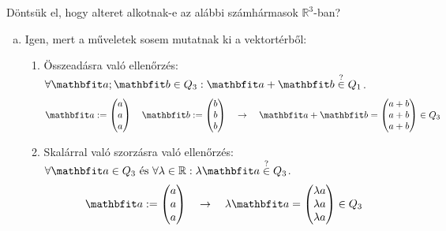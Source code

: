 \begin{exercise}{%
    Döntsük el, hogy alteret alkotnak-e az alábbi számhármasok
    $\mathbb R^3$-ban?
  }
{\begin{enumerate}[a)]
            \tcbline
      \item Igen, mert a műveletek sosem mutatnak ki a vektortérből:
            \begin{enumerate}[1)]
              \item Összeadásra való ellenőrzés:
                    $\forall \rvec a ; \rvec b \in Q_3:
                      \rvec a + \rvec b \overset{?}{\in} Q_1$.
                    \[
                      \rvec a := \begin{pmatrix} a \\ a \\ a \end{pmatrix}
                      \quad
                      \rvec b := \begin{pmatrix} b \\ b \\ b \end{pmatrix}
                      \quad \rightarrow \quad
                      \rvec a + \rvec b
                      = \begin{pmatrix} a + b \\ a + b \\ a + b \end{pmatrix}
                      \in Q_3
                    \]

              \item Skalárral való szorzásra való ellenőrzés:
                    $\forall \rvec a \in Q_3 \text{ és } \forall \lambda \in \mathbb R:
                      \lambda \rvec a \overset{?}{\in} Q_3$.
                    \[
                      \rvec a := \begin{pmatrix} a \\ a \\ a \end{pmatrix}
                      \quad \rightarrow \quad
                      \lambda \rvec a
                      = \begin{pmatrix} \lambda a \\ \lambda a \\ \lambda a \end{pmatrix}
                      \in Q_3
                    \]
            \end{enumerate}


\end{enumerate}}
\end{exercise}
